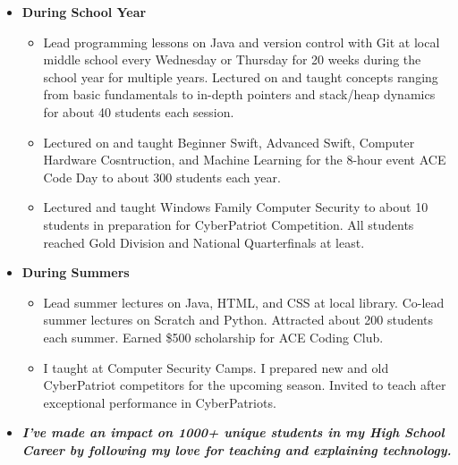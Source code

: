 \documentclass[10pt]{article}
\newenvironment{outerlist}[1][\enskip\textbullet]%
        {\begin{itemize}[#1,leftmargin=*]}{\end{itemize}%
         \vspace{-.6\baselineskip}}
\newenvironment{innerlist}[1][\enskip\textbullet]%
        {\begin{itemize}[#1,leftmargin=*,parsep=0pt,itemsep=0pt,topsep=0pt,partopsep=0pt]}
        {\end{itemize}}
\begin{document}
\begin{outerlist}
\item[] \textbf{During School Year}
\begin{innerlist}
\item[] Lead programming lessons on Java and version control with Git at local middle school every Wednesday or Thursday for 20 weeks during the school year for multiple years. Lectured on and taught concepts ranging from basic fundamentals to in-depth pointers and stack/heap dynamics for about 40 students each session. 
\vspace{.1in}
\item[] Lectured on and taught Beginner Swift, Advanced Swift, Computer Hardware Cosntruction, and Machine Learning for the 8-hour event ACE Code Day to about 300 students each year.
\vspace{.1in}
\item[] Lectured and taught Windows Family Computer Security to about 10 students in preparation for CyberPatriot Competition. All students reached Gold Division and National Quarterfinals at least.
\end{innerlist}
\item[] \textbf{During Summers}
\begin{innerlist}
\item[] Lead summer lectures on Java, HTML, and CSS at local library. Co-lead summer lectures on Scratch and Python. Attracted about 200 students each summer. Earned \$500 scholarship for ACE Coding Club.
\vspace{.1in}
\item[] I taught at Computer Security Camps. I prepared new and old CyberPatriot competitors for the upcoming season. Invited to teach after exceptional performance in CyberPatriots.  
\end{innerlist}
\item[] \textbf{\emph{I've made an impact on 1000+ unique students in my High School Career by following my love for teaching and explaining technology.}}
\end{outerlist}
\end{document}
